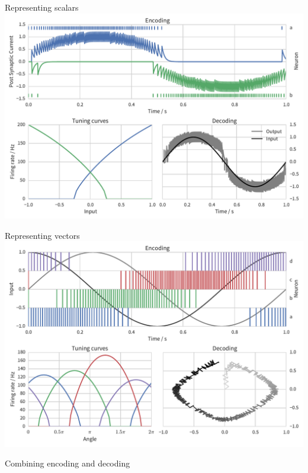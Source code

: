 \documentclass[t]{beamer}
\begin{document}
  \begin{frame}[plain]{Representing scalars}
    \vfill
    \includegraphics[width=\textwidth]{encoding_decoding}
    \vfill
  \end{frame}

  \begin{frame}[plain]{Representing vectors}
    \vfill
    \includegraphics[width=\textwidth]{encoding_decoding2d}
    \vfill
  \end{frame}

  \begin{frame}{Combining encoding and decoding}
  \end{frame}

\end{document}
